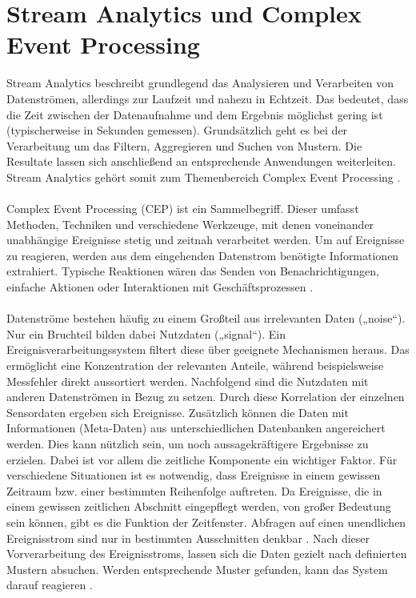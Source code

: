 \section{Stream Analytics und Complex Event Processing}
Stream Analytics beschreibt grundlegend das Analysieren und Verarbeiten von Datenströmen, allerdings zur Laufzeit und nahezu in Echtzeit. Das bedeutet, dass die Zeit zwischen der Datenaufnahme und dem Ergebnis möglichst gering ist (typischerweise in Sekunden gemessen). Grundsätzlich geht es bei der Verarbeitung um das Filtern, Aggregieren und Suchen von Mustern. Die Resultate lassen sich anschließend an entsprechende Anwendungen weiterleiten. Stream Analytics gehört somit zum Themenbereich Complex Event Processing \cite{GesellschaftfurInformatik.2009}.\\ \\ 
Complex Event Processing (CEP) ist ein Sammelbegriff. Dieser umfasst Methoden, Techniken und verschiedene Werkzeuge, mit denen voneinander unabhängige Ereignisse stetig und zeitnah verarbeitet werden. Um auf Ereignisse zu reagieren, werden aus dem eingehenden Datenstrom benötigte Informationen extrahiert. Typische Reaktionen wären das Senden von Benachrichtigungen, einfache Aktionen oder Interaktionen mit Geschäftsprozessen \cite{GesellschaftfurInformatik.2009}. \\ \\
Datenströme bestehen häufig zu einem Großteil aus irrelevanten Daten („noise“). Nur ein Bruchteil bilden dabei Nutzdaten („signal“). Ein Ereignisverarbeitungssystem filtert diese über geeignete Mechanismen heraus. Das ermöglicht eine Konzentration der relevanten Anteile, während beispielsweise Messfehler direkt aussortiert werden. Nachfolgend sind die Nutzdaten mit anderen Datenströmen in Bezug zu setzen. Durch diese Korrelation der einzelnen Sensordaten ergeben sich Ereignisse. Zusätzlich können die Daten mit Informationen (Meta-Daten) aus unterschiedlichen Datenbanken angereichert werden. Dies kann nützlich sein, um noch aussagekräftigere Ergebnisse zu erzielen. Dabei ist vor allem die zeitliche Komponente ein wichtiger Faktor. Für verschiedene Situationen ist es notwendig, dass Ereignisse in einem gewissen Zeitraum bzw. einer bestimmten Reihenfolge auftreten. Da Ereignisse, die in einem gewissen zeitlichen Abschnitt eingepflegt werden, von großer Bedeutung sein können, gibt es die Funktion der Zeitfenster. Abfragen auf einen unendlichen Ereignisstrom sind nur in bestimmten Ausschnitten denkbar \cite{GesellschaftfurInformatik.2009}. Nach dieser Vorverarbeitung des Ereignisstroms, lassen sich die Daten gezielt nach definierten Mustern absuchen. Werden entsprechende Muster gefunden, kann das System darauf reagieren \cite{Bruening.2016}.

\ifCLASSOPTIONcaptionsoff
  \newpage
\fi